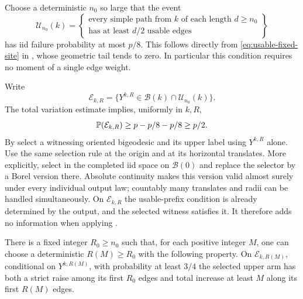 Choose a deterministic $n_0$ so large that the event
\[
 \mathcal U_{n_0}(k)=
 \left\{\begin{array}{l}
 \text{every simple path from $k$ of each length $d\geq n_0$}\\
 \text{has at least $d/2$ usable edges}
 \end{array}\right\}
\]
has iid failure probability at most $p/8$. This follows directly from
\eqref{eq:usable-fixed-site} in , whose geometric tail
tends to zero. In particular this condition requires no moment of a
single edge weight.

Write
\[
 \mathcal E_{k,R}=
 \{Y^{k,R}\in\mathcal B(k)\cap\mathcal U_{n_0}(k)\}.
\]
The total variation estimate implies, uniformly in $k,R$,
\begin{equation}\label{eq:output-good-probability}
 \mathbb P(\mathcal E_{k,R})
 \geq p-p/8-p/8\geq p/2.
\end{equation}
By  select a witnessing oriented bigeodesic and its
upper label using $Y^{k,R}$ alone.  Use the same selection rule at the
origin and at its horizontal translates.  More explicitly, select in
the completed iid space on $\mathcal B(0)$ and replace the selector by
a Borel version there.  Absolute continuity makes this version valid
almost surely under every individual output law; countably many
translates and radii can be handled simultaneously.  On
$\mathcal E_{k,R}$ the usable-prefix condition is already determined by
the output, and the selected witness satisfies it.  It therefore adds
no information when applying .

\begin{lemma}\label{lem:divergent-gain}
There is a fixed integer $R_0\geq n_0$ such that, for each positive
integer $M$, one can choose a deterministic $R(M)\geq R_0$ with the
following property.  On $\mathcal E_{k,R(M)}$, conditional on
$Y^{k,R(M)}$, with probability at least $3/4$ the selected upper arm has
both a strict raise among its first $R_0$ edges and total increase at
least $M$ along its first $R(M)$ edges.
\end{lemma}

